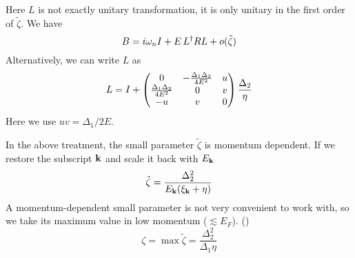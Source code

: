 Here $L$ is not exactly unitary transformation, it is only unitary in the first order of  $\tilde\zeta$. We have 
\[
B=i\omega_{n}I+E\,L^{\dagger}RL+o(\tilde\zeta)
\]
Alternatively, we can write $L$ as 
\begin{equation}
L=I+
\begin{pmatrix}0&-\frac{\Delta_{1}\Delta_{2}}{4E^{2}}&u\\
\frac{\Delta_{1}\Delta_{2}}{4E^{2}}&0&v\\
-u&v&0
\end{pmatrix}\frac{\Delta_{2}}{\eta}
\end{equation}
Here we use $uv=\Delta_{1}/2E$.

In the above treatment, the small parameter $\tilde\zeta$ is momentum dependent.  If we restore the subscript $\mathbf{k}$ and scale it  back with $E_{\mathbf{k}}$
\begin{equation}
\tilde\zeta=\frac{\Delta_{2}^{2}}{E_{\mathbf{k}}(\xi_{\mathbf{k}}+\eta)}
\end{equation}
A momentum-dependent small parameter is not very convenient to work with, so we take its maximum value in low momentum ($\lesssim{}E_{F}$). ()
\begin{equation}
\zeta=\max\tilde{\zeta}=\frac{\Delta_{2}^{2}}{\Delta_{1}\eta}
\end{equation}


